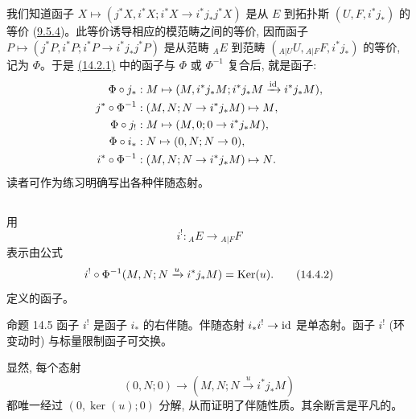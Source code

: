 \subsection{}
我们\pageoriginale 知道函子 $X\mapsto (j^{\ast}X,
i^{\ast}X;i^{\ast}X\rightarrow i^{\ast}j_{\ast}j^{\ast}X)$ 是从 $E$ 到拓扑斯 $(U,F,i^{\ast}j_{\ast})$ 的等价 (\hyperref[IV.theo9.5.4]{9.5.4})。此等价诱导相应的模范畴之间的等价, 因而函子 $P\mapsto (j^{\ast}P,i^{\ast}P;
i^{\ast}P\rightarrow i^{\ast}j_{\ast}j^{\ast}P)$ 是从范畴 ${}_AE$ 到范畴 $({}_{A| U}U,{}_{A| F}F,i^{\ast}j_{\ast})$ 的等价, 记为 $\Phi$。于是 \hyperref[IV.eq14.2.1]{(14.2.1)} 中的函子与 $\Phi$ 或 $\Phi^{-1}$ 复合后, 就是函子:
\begin{align*}
\Phi\circ j_{\ast} &: M\mapsto (M,i^{\ast} j_{\ast}M;
i^{\ast}j_{\ast}M\xrightarrow{\operatorname{id}} i^{\ast}j_{\ast}M){},\\
j^{\ast}\circ \Phi^{-1} &: (M,N; N\rightarrow
i^{\ast}j_{\ast}M)\mapsto M{},\\
\Phi\circ j_{!} &: M\mapsto (M,0;0\rightarrow i^{\ast}
j_{\ast}M){},\\
\Phi\circ i_{\ast} &: N\mapsto (0,N;N\rightarrow 0){},\\
i^{\ast}\circ \Phi^{-1} &: (M,N;N\rightarrow
i^{\ast}j_{\ast}M)\mapsto N{}.
\end{align*}
读者可作为练习明确写出各种伴随态射。

\subsection{}
用
\begin{equation*}
i^{!}:{}_AE\longrightarrow {}_{A| F}F\tag{14.4.1}
\end{equation*}
表示由公式
\begin{equation*}
i^{!}\circ
\Phi^{-1}(M,N;N\xrightarrow{u}i^{\ast}j_{\ast}M)=\operatorname{Ker}(u){}.\tag{14.4.2}
\end{equation*}
定义的函子。

\begin{enonce*}{命题 14.5}
函子 $i^{!}$ 是函子 $i_{\ast}$ 的右伴随。伴随态射 $i_{\ast}i^{!}\rightarrow\operatorname{id}$ 是单态射。函子 $i^{!}$ (环变动时) 与标量限制函子可交换。
\end{enonce*}

显然, 每个态射
$$
(0,N;0)\longrightarrow (M,N;N\xrightarrow{u}i^{\ast}j_{\ast}M)
$$
都唯一经过 $(0,\ker(u);0)$ 分解, 从而证明了伴随性质。其余断言是平凡的。

